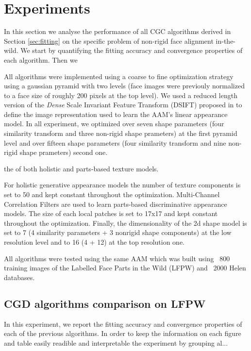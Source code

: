 \section{Experiments}
\label{sec:experiment}

 In this section we analyse the performance of all CGC algorithms derived in Section \ref{sec:fitting} on the specific problem of non-rigid face alignment in-the-wild. We start by quantifying the fitting accuracy and convergence properties of each algorithm. Then we


 All algorithms were implemented using a coarse to fine optimization strategy using a gaussian pyramid with two levels (face images were previouly normalized to a face size of roughly 200 pixels at the top level). We used a reduced length version of the \emph{Dense} Scale Invariant Feature Transform (DSIFT) \cite{Lowe1999} proposed in \cite{} to define the image representation used to learn the AAM's linear appearance model. In all experiment, we optimized over seven shape parameters (four similarity transform and three non-rigid shape prameters) at the first pyramid level and over fifteen shape parameters (four similarity transform and nine non-rigid shape prameters) second one.



 the  of both holistic and parts-based texture models.


 For holistic generative appearance models the number of texture components is set to 50 and kept constant throughout the optimization. Multi-Channel Correlation Filters \cite{Galoogahi2013} are used to learn parts-based discriminative appearance models. The size of each local patches is set to 17x17 and kept constant throughout the optimization. Finally, the dimensionality of the 2d shape model is set to 7 (4 similarity parameters + 3 nonrigid shape components) at the low resolution level and to 16 (4 + 12) at the top resolution one.


 All algorithms were tested using the same AAM which was built using ~800  training images of the Labelled Face Parts in the Wild (LFPW) \cite{Belhumeur2011} and ~2000 Helen \cite{Le2012} databases.
\subsection{CGD algorithms comparison on LFPW}

In this experiment, we report the fitting accuracy and convergence properties of each of the previous algorithms. In order to keep the information on each figure and table easily readible and interpretable the experiment by grouping al...


